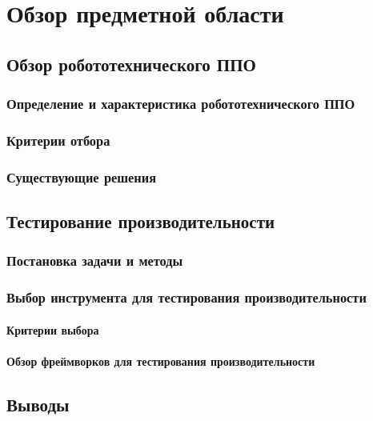 \chapter{Обзор предметной области}
\label{title:chapter1}
\section{Обзор робототехнического ППО}
	\subsection{Определение и характеристика робототехнического ППО}
	\label{title:chapter1:robo_middleware_definition}
	
	\subsection{Критерии отбора}
	
	\label{title:chapter1:mars_criterias}
	\subsection{Существующие решения}
	
	\label{title:chapter1:mars_solutions}
\section{Тестирование производительности}
	\subsection{Постановка задачи и методы}
	\label{title:chapter1:performance_testing_approaches}
	
	\subsection{Выбор инструмента для тестирования производительности}
		\subsubsection{Критерии выбора}
		\label{title:chapter1:performance_testing_criterias}
		
		\subsubsection{Обзор фреймворков для тестирования производительности}
		\label{title:chapter1:performance_testing_benchmarks_review}
		
\section{Выводы}
\label{title:chapter1:conclusions}
